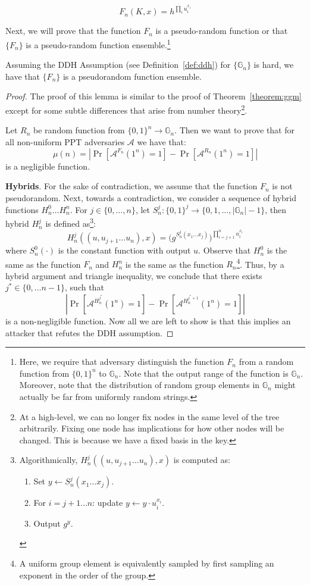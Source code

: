 \documentclass[12pt]{tufte-book}
\begin{document}
\[F_n(K,x) = h^{\prod_{i} u_i^{x_i}}\]

Next, we will prove that the function $F_n$ is a pseudo-random function or that $\{F_n\}$ is a pseudo-random function ensemble.\footnote{Here, we require that adversary distinguish the function $F_n$ from a random function from $\{0,1\}^n$ to $\mathbb{G}_n$. Note that the output range of the function is $\mathbb{G}_n$. Moreover, note that the distribution of random group elements in $\mathbb{G}_n$ might actually be far from uniformly random strings.}
\begin{lemma}
    Assuming the DDH Assumption (see Definition~\ref{def:ddh}) for $\{\mathbb{G}_n\}$ is hard, we have that $\{F_n\}$ is a pseudorandom function ensemble.
\end{lemma}
\begin{proof}
    The proof of this lemma is similar to the proof of Theorem~\ref{theorem:ggm} except for some subtle differences that arise from number theory\footnote{At a high-level, we can no longer fix nodes in the same level of the tree arbitrarily. Fixing one node has implications for how other nodes will be changed. This is because we have a fixed basis in the key.}.

    Let $R_n$ be random function from $\{0,1\}^n \rightarrow \mathbb{G}_n$. Then we want to prove that for all non-uniform PPT adversaries $\mathcal{A}$ we have that:
    \[\mu(n) = \left|\Pr[\mathcal{A}^{F_n}(1^n) =1] -  \Pr[\mathcal{A}^{R_n}(1^n) =1]\right|\]
    is a negligible function. \smallskip

    \noindent \textbf{Hybrids}. For the sake of contradiction, we assume that the function $F_n$ is not pseudorandom. Next, towards a contradiction, we consider a sequence of hybrid functions $H^0_n \ldots H^n_n$.
    For $j \in \{0, \dots, n\}$, let $S^j_n: \{0, 1\}^j \to \{0, 1, \dots, |\mathbb{G}_n|-1\}$, then hybrid $H_n^j$ is defined as\footnote{Algorithmically, $H_n^j((u,u_{j+1}\ldots u_n),x)$ is computed as:
    \begin{enumerate}
        \item Set $y \gets S_n^j(x_1\ldots x_j)$.
        \item For $i = j+1 \dots n$: update $y \gets y \cdot u_i^{x_i}$.
        \item Output $g^y$.
    \end{enumerate}

    }:
    \begin{equation*}
        H_n^j((u,u_{j+1}\ldots u_n),x) = \big(g^{S_n^j(x_1\ldots x_j)}\big)^{\prod_{i=j+1}^n u_i^{x_i}}
    \end{equation*}
    where $S_n^0(\cdot)$ is the constant function with output $u$. Observe that $H_n^0$ is the same as the function $F_n$ and $H_n^n$ is the same as the function $R_n$\footnote{A uniform group element is equivalently sampled by first sampling an exponent in the order of the group.}. Thus, by a hybrid argument and triangle inequality, we conclude that there exists $j^* \in \{0,\ldots n-1\}$, such that
    \[\left|\Pr[\mathcal{A}^{H_n^{j^*}}(1^n) =1] -  \Pr[\mathcal{A}^{H_n^{j^*+1}}(1^n) =1]\right|\]
    is a non-negligible function. Now all we are left to show is that this implies an attacker that refutes the DDH assumption.\smallskip


\end{proof}
\end{document}
